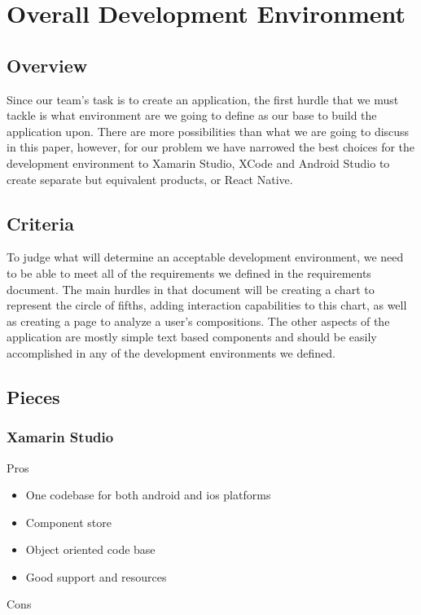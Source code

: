 \documentclass[onecolumn, draftclsnofoot,10pt, compsoc]{IEEEtran}
\begin{document}
\section{Overall Development Environment}
\subsection{Overview}
Since our team's task is to create an application, the first hurdle that we must tackle is what environment are we going to define as our base to build the application upon.
There are more possibilities than what we are going to discuss in this paper, however, for our problem we have narrowed the best choices for the development environment to Xamarin Studio, XCode and Android Studio to create separate but equivalent products, or React Native.

\subsection{Criteria}
To judge what will determine an acceptable development environment, we need to be able to meet all of the requirements we defined in the requirements document.
The main hurdles in that document will be creating a chart to represent the circle of fifths, adding interaction capabilities to this chart, as well as creating a page to analyze a user's compositions.
The other aspects of the application are mostly simple text based components and should be easily accomplished in any of the development environments we defined.

\subsection{Pieces}
\subsubsection{Xamarin Studio}

Pros

\begin{itemize}
    \item One codebase for both android and ios platforms
    \item Component store
    \item Object oriented code base
    \item Good support and resources
\end{itemize}

Cons
\end{document}
